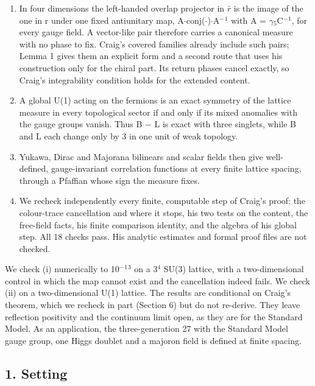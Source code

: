 \documentclass[
]{article}
\begin{document}
\begin{enumerate}
\def\labelenumi{(\roman{enumi})}
\item
  In four dimensions the left-handed overlap projector in \ensuremath{\bar{r}} is the image
  of the one in r under one fixed antiunitary map, A\ensuremath{\cdot}conj(\ensuremath{\cdot})\ensuremath{\cdot}A\ensuremath{^{-}}\ensuremath{^{1}} with A
  = \ensuremath{\gamma}\ensuremath{_{5}}C\ensuremath{^{-}}\ensuremath{^{1}}, for every gauge field. A vector-like pair therefore carries a
  canonical measure with no phase to fix. Craig's covered families
  already include such pairs; Lemma 1 gives them an explicit form and a
  second route that uses his construction only for the chiral part. Its
  return phases cancel exactly, so Craig's integrability condition holds
  for the extended content.
\item
  A global U(1) acting on the fermions is an exact symmetry of the
  lattice measure in every topological sector if and only if its mixed
  anomalies with the gauge groups vanish. Thus B \ensuremath{-} L is exact with three
  singlets, while B and L each change only by 3 in one unit of weak
  topology.
\item
  Yukawa, Dirac and Majorana bilinears and scalar fields then give
  well-defined, gauge-invariant correlation functions at every finite
  lattice spacing, through a Pfaffian whose sign the measure fixes.
\item
  We recheck independently every finite, computable step of Craig's
  proof: the colour-trace cancellation and where it stops, his two tests
  on the content, the free-field facts, his finite comparison identity,
  and the algebra of his global step. All 18 checks pass. His analytic
  estimates and formal proof files are not checked.
\end{enumerate}

We check (i) numerically to 10\ensuremath{^{-}}\ensuremath{^{1}}\ensuremath{^{3}} on a 3\ensuremath{^{4}} SU(3) lattice, with a
two-dimensional control in which the map cannot exist and the
cancellation indeed fails. We check (ii) on a two-dimensional U(1)
lattice. The results are conditional on Craig's theorem, which we
recheck in part (Section 6) but do not re-derive. They leave reflection
positivity and the continuum limit open, as they are for the Standard
Model. As an application, the three-generation 27 with the Standard
Model gauge group, one Higgs doublet and a majoron field is defined at
finite spacing.

\hypertarget{setting}{%
\subsection{1. Setting}\label{setting}}
\end{document}
